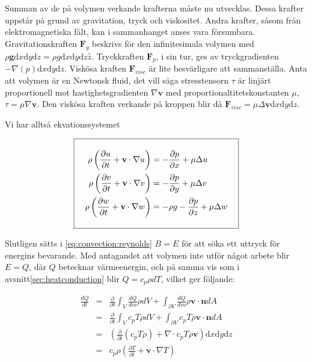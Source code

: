 Summan av de på volymen verkande krafterna måste nu utvecklas. Dessa krafter uppstår på grund av gravitation, tryck och viskositet. Andra krafter, såsom från elektromagnetiska fält, kan i sammanhanget anses vara försumbara. Gravitationskraften $\mathbf{F}_g$ beskrivs för den infinitesimala volymen med $\rho \mathbf{g} \mathrm{d}x\mathrm{d}y\mathrm{d}z = \rho g \mathrm{d}x\mathrm{d}y\mathrm{d}z \hat{z}$. Tryckkraften $\mathbf{F}_p$, i sin tur, ges av tryckgradienten $-\nabla \left( p \right) \mathrm{d}x\mathrm{d}y\mathrm{d}z$. Viskösa kraften $\mathbf{F}_{visc}$ är lite besvärligare att sammanställa. Anta att volymen är en Newtonsk fluid, det vill säga stresstensorn $\tau$ är linjärt proportionell mot hastighetsgradienten $\nabla\mathbf{v}$ med proportionaltitetskonstanten $\mu$, $\tau = \mu \nabla \mathbf{v}$. Den viskösa kraften verkande på kroppen blir då $\mathbf{F}_{visc} = \mu\Delta\mathbf{v}\mathrm{d}x\mathrm{d}y\mathrm{d}z$.


Vi har alltså ekvationssystemet

\begin{equation}
\label{eq:convection:momentum}
\addtolength{\fboxsep}{10pt} 
\boxed{ 
\begin{aligned} 
\rho\left(\frac{\partial u}{\partial t} + \mathbf{v}\cdot \nabla u\right) & = -\frac{\partial p}{\partial x} + \mu\Delta u\\
\rho\left(\frac{\partial v}{\partial t} + \mathbf{v}\cdot \nabla v\right) & = -\frac{\partial p}{\partial y} + \mu\Delta v\\
\rho\left(\frac{\partial w}{\partial t} + \mathbf{v}\cdot \nabla w\right) & = -\rho g -\frac{\partial p}{\partial z} + \mu\Delta w  
\end{aligned} 
} 
\end{equation}


Slutligen sätts i \ref{eq:convection:reynolds} $B=E$ för att söka ett uttryck för energins bevarande. Med antagandet att volymen inte utför något arbete blir $E = Q$, där $Q$ betecknar värmeenergin, och på samma vis som i avsnitt\ref{sec:heatconduction} blir $Q = c_p \rho dT$, vilket ger följande:

\begin{eqnarray}
\label{reynoldsenergyone}
\frac{dQ}{dt} & = & \frac{\partial}{\partial t} \int_V \frac{dQ}{dm}\rho dV + \int_{\partial V}\frac{dQ}{dm}\rho \mathbf{v} \cdot \mathbf{n} dA \nonumber\\
& = & \frac{\partial}{\partial t} \int_V c_p T \rho dV + \int_{\partial V} c_p T \rho \mathbf{v} \cdot \mathbf{n} dA \nonumber\\
& = & \left(\frac{\partial}{\partial t} \left( c_p T \rho \right) + \nabla\cdot c_p T \rho \mathbf{v}\right) \mathrm{d}x\mathrm{d}y\mathrm{d}z \nonumber\\
& = & c_p \rho \left( \frac{\partial T}{\partial t} + \mathbf{v}\cdot \nabla T\right)
\end{eqnarray}

